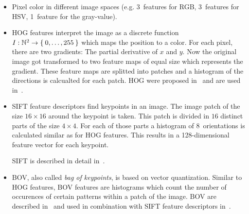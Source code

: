 \begin{itemize}
    \item Pixel color in different image spaces (e.g. 3~features for RGB,
          3~features for HSV, 1~feature for the gray-value).
    \item \Gls{HOG} features interpret the image as a discrete function
          $I: \mathbb{N}^2 \rightarrow \Set{0, \dots, 255}$ which maps the
          position to a color. For each pixel, there are two gradients: The
          partial derivative of $x$ and $y$. Now the original image got
          transformed to two feature maps of equal size which represents the
          gradient. These feature maps are splitted into patches and a
          histogram of the directions is calcualted for each patch. \gls{HOG}
          were proposed in~\cite{1467360} and
          are used in~\cite{bourdev2010detecting,felzenszwalb2010object}.
    \item \Gls{SIFT} feature descriptors find keypoints in an image. The image patch
          of the size $16 \times 16$ around the keypoint is taken. This patch
          is divided in $16$ distinct parts of the size $4 \times 4$. For each
          of those parts a histogram of 8~orientations is calculated similar as
          for \gls{HOG} features. This results in a 128-dimensional feature
          vector for each keypoint.

          \Gls{SIFT} is described in detail in~\cite{raey}.

    \item \Gls{BOV}, also called \textit{bag of keypoints}, is based on vector
          quantization. Similar to \gls{HOG} features, \gls{BOV} features are
          histograms which count the number of occurences of certain patterns
          within a patch of the image. \Gls{BOV} are described
          in~\cite{csurka2004visual} and used in combination with \gls{SIFT}
          feature descriptors in~\cite{csurka2008simple}.
\end{itemize}

